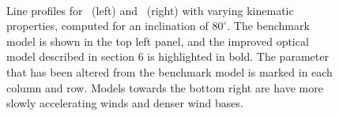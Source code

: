 \documentclass[preprint, a4paper, 11pt]{aastex}
\begin{document}
{\begin{figure} %
\mbox{
\quad
{}   
}
\caption{
Line profiles for \ha\ (left) and \hb\ (right) with varying kinematic 
properties, computed for an inclination of $80^\circ$.
The benchmark model is shown in the top left panel, and the improved optical
model described in section 6 is highlighted in bold. 
The parameter that has been altered from the benchmark model 
is marked in each column and row. 
Models towards the bottom right
are have more slowly accelerating winds and denser wind bases.  
}
\label{halpha}
\end{figure} %



}
\end{document}
